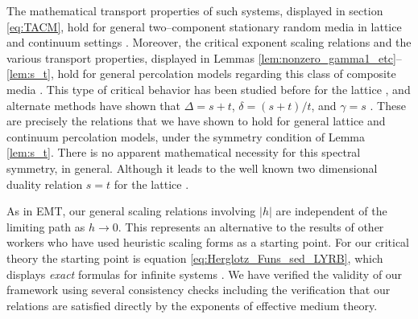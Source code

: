 \documentclass[english,12pt,jmp,graphicx]{revtex4-1}
\begin{document}
The mathematical transport properties of such systems, displayed in
section \ref{eq:TACM}, hold for general two--component stationary
random media in lattice and continuum settings
\cite{Golden:CMP-473}. Moreover, the critical exponent scaling
relations and the various transport properties, displayed in Lemmas
\ref{lem:nonzero_gamma1_etc}--\ref{lem:s_t}, hold for general
percolation models regarding this class of composite media
\cite{Golden:PRL-3935}. This  type of critical behavior has been
studied before for the lattice 
\cite{Efros:PSSB-303,Clerc:AP-191,Bergman:SSP-147}, and alternate 
methods have shown that $\Delta=s+t$, $\delta=(s+t)/t$, and $\gamma=s$
\cite{Golden:PRL-3935}. These are precisely the relations that we have 
shown to hold for general lattice and continuum percolation models,
under the symmetry condition of Lemma \ref{lem:s_t}. There is no
apparent mathematical necessity for this spectral symmetry, in
general. Although it leads to the well known two dimensional duality
relation $s=t$ for the lattice
\cite{Bergman:SSP-147,Clerc:AP-191,Efros:PSSB-303}. 

As in EMT, our general scaling relations involving $|h|$ are
independent of the limiting path as $h\to0$. This represents an alternative to the
results of other workers
\cite{Efros:PSSB-303,Clerc:AP-191,Bergman:SSP-147} who have used heuristic
scaling forms as a starting point. For our critical
theory the starting point is equation \eqref{eq:Herglotz_Funs_sed_LYRB}, which displays
\emph{exact} formulas for infinite systems \cite{Golden:PRL-3935}. We
have verified the validity of our framework using several consistency
checks including the verification that our relations are satisfied directly
by the exponents of effective medium theory.



%
%
\end{document}
